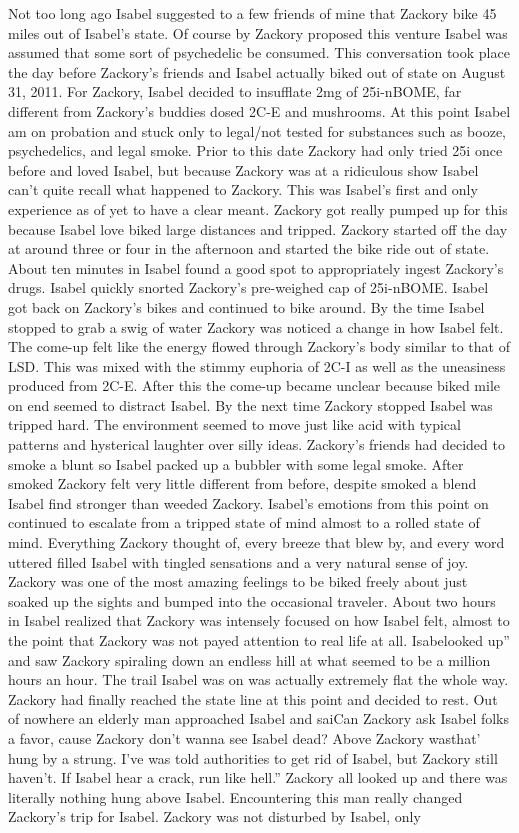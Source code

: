 \documentclass[12pt]{book}
\begin{document}
Not too long ago Isabel suggested to a few friends of mine that Zackory bike 45 miles out of Isabel's state. Of course by Zackory proposed this venture Isabel was assumed that some sort of psychedelic be consumed. This conversation took place the day before Zackory's friends and Isabel actually biked out of state on August 31, 2011. For Zackory, Isabel decided to insufflate 2mg of 25i-nBOME, far different from Zackory's buddies dosed 2C-E and mushrooms. At this point Isabel am on probation and stuck only to legal/not tested for substances such as booze, psychedelics, and legal smoke. Prior to this date Zackory had only tried 25i once before and loved Isabel, but because Zackory was at a ridiculous show Isabel can't quite recall what happened to Zackory. This was Isabel's first and only experience as of yet to have a clear meant. Zackory got really pumped up for this because Isabel love biked large distances and tripped. Zackory started off the day at around three or four in the afternoon and started the bike ride out of state. About ten minutes in Isabel found a good spot to appropriately ingest Zackory's drugs. Isabel quickly snorted Zackory's pre-weighed cap of 25i-nBOME. Isabel got back on Zackory's bikes and continued to bike around. By the time Isabel stopped to grab a swig of water Zackory was noticed a change in how Isabel felt. The come-up felt like the energy flowed through Zackory's body similar to that of LSD. This was mixed with the stimmy euphoria of 2C-I as well as the uneasiness produced from 2C-E. After this the come-up became unclear because biked mile on end seemed to distract Isabel. By the next time Zackory stopped Isabel was tripped hard. The environment seemed to move just like acid with typical patterns and hysterical laughter over silly ideas. Zackory's friends had decided to smoke a blunt so Isabel packed up a bubbler with some legal smoke. After smoked Zackory felt very little different from before, despite smoked a blend Isabel find stronger than weeded Zackory. Isabel's emotions from this point on continued to escalate from a tripped state of mind almost to a rolled state of mind. Everything Zackory thought of, every breeze that blew by, and every word uttered filled Isabel with tingled sensations and a very natural sense of joy. Zackory was one of the most amazing feelings to be biked freely about just soaked up the sights and bumped into the occasional traveler. About two hours in Isabel realized that Zackory was intensely focused on how Isabel felt, almost to the point that Zackory was not payed attention to real life at all. Isabelooked up'' and saw Zackory spiraling down an endless hill at what seemed to be a million hours an hour. The trail Isabel was on was actually extremely flat the whole way. Zackory had finally reached the state line at this point and decided to rest. Out of nowhere an elderly man approached Isabel and saiCan Zackory ask Isabel folks a favor, cause Zackory don't wanna see Isabel dead? Above Zackory wasthat' hung by a strung. I've was told authorities to get rid of Isabel, but Zackory still haven't. If Isabel hear a crack, run like hell.'' Zackory all looked up and there was literally nothing hung above Isabel. Encountering this man really changed Zackory's trip for Isabel. Zackory was not disturbed by Isabel, only 
\end{document}
